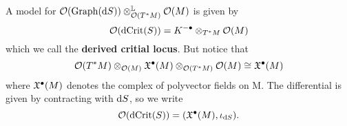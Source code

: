 \begin{example}
\begin{itemize}
\begin{equation*}
    \end{equation*}
    A model for $\mathcal{O}(\operatorname{Graph}(\mathrm{d} S)) \otimes_{\mathcal{O}(T^* M)}^{\mathbb{L}} \mathcal{O}(M)$ is given by
    \begin{equation*}
      \mathcal{O}(\operatorname{dCrit}(S)) = K^{-\bullet} \otimes_{T^* M} \mathcal{O}(M)
    \end{equation*}
    which we call the \textbf{derived critial locus}. But notice that
    \begin{equation*}
      \mathcal{O}(T^* M) \otimes_{\mathcal{O}(M)} \mathfrak{X}^\bullet(M) \otimes_{\mathcal{O}(T^* M)} \mathcal{O}(M) \cong \mathfrak{X}^\bullet(M)
    \end{equation*}
    where $\mathfrak{X}^\bullet(M)$ denotes the complex of polyvector fields on M. The differential is given by contracting with $\mathrm{d} S$, so we write
    \begin{equation*}
      \mathcal{O}(\operatorname{dCrit}(S)) = (\mathfrak{X}^\bullet(M), \iota_{\mathrm{d} S}).
    \end{equation*}
  \end{itemize}
\end{example}
